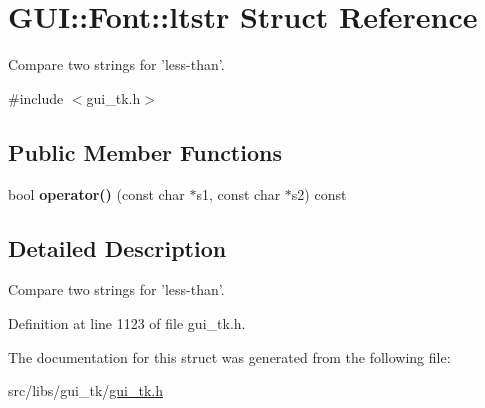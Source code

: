 \hypertarget{structGUI_1_1Font_1_1ltstr}{\section{G\-U\-I\-:\-:Font\-:\-:ltstr Struct Reference}
\label{structGUI_1_1Font_1_1ltstr}
}


Compare two strings for 'less-\/than'.  




{\ttfamily \#include $<$gui\-\_\-tk.\-h$>$}

\subsection*{Public Member Functions}
\begin{DoxyCompactItemize}
\item 
\hypertarget{structGUI_1_1Font_1_1ltstr_ac7c504afcbc1bb5c7d14c84b6fecedc2}{bool {\bfseries operator()} (const char $\ast$s1, const char $\ast$s2) const }\label{structGUI_1_1Font_1_1ltstr_ac7c504afcbc1bb5c7d14c84b6fecedc2}

\end{DoxyCompactItemize}


\subsection{Detailed Description}
Compare two strings for 'less-\/than'. 

Definition at line 1123 of file gui\-\_\-tk.\-h.



The documentation for this struct was generated from the following file\-:\begin{DoxyCompactItemize}
\item 
src/libs/gui\-\_\-tk/\hyperlink{gui__tk_8h}{gui\-\_\-tk.\-h}\end{DoxyCompactItemize}
